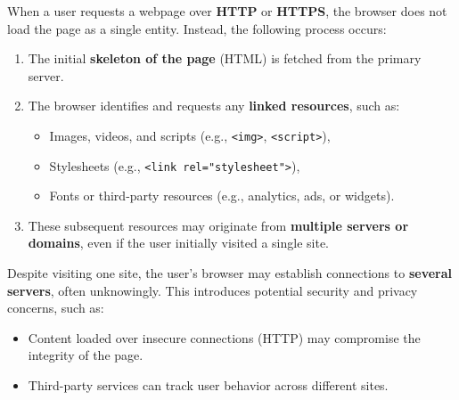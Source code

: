 \begin{theo}

    \label{theo:http_https_loading}
    When a user requests a webpage over \textbf{HTTP} or \textbf{HTTPS}, the browser does not load the page as a single entity. Instead, the following process occurs:
    \begin{enumerate}
        \item The initial \textbf{skeleton of the page} (HTML) is fetched from the primary server.
        \item The browser identifies and requests any \textbf{linked resources}, such as:
        \begin{itemize}
            \item Images, videos, and scripts (e.g., \texttt{<img>}, \texttt{<script>}),
            \item Stylesheets (e.g., \texttt{<link rel="stylesheet">}),
            \item Fonts or third-party resources (e.g., analytics, ads, or widgets).
        \end{itemize}
        \item These subsequent resources may originate from \textbf{multiple servers or domains}, even if the user initially visited a single site.
    \end{enumerate}
    \end{theo}

    \newpage 

\begin{theo}

    Despite visiting one site, the user's browser may establish connections to \textbf{several servers}, often unknowingly. This introduces potential security and privacy concerns, such as:
    \begin{itemize}
        \item Content loaded over insecure connections (HTTP) may compromise the integrity of the page.
        \item Third-party services can track user behavior across different sites.
    \end{itemize}
    
\end{theo}
    
